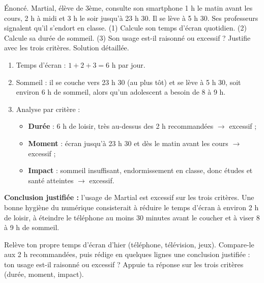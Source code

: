 \documentclass[11pt]{article}
\begin{document}
\begin{exoresolu}
Énoncé. Martial, élève de 3ème, consulte son smartphone 1 h le matin avant les cours, 2 h à midi et 3 h le soir jusqu'à 23 h 30. Il se lève à 5 h 30. Ses professeurs signalent qu'il s'endort en classe. (1) Calcule son temps d'écran quotidien. (2) Calcule sa durée de sommeil. (3) Son usage est-il raisonné ou excessif ? Justifie avec les trois critères.
\tcblower
Solution détaillée.
\begin{enumerate}
\item Temps d'écran : $1 + 2 + 3 = 6$ h par jour.
\item Sommeil : il se couche vers 23 h 30 (au plus tôt) et se lève à 5 h 30, soit environ $6$ h de sommeil, alors qu'un adolescent a besoin de 8 à 9 h.
\item Analyse par critère :
\begin{itemize}
\item \textbf{Durée} : 6 h de loisir, très au-dessus des 2 h recommandées $\rightarrow$ excessif ;
\item \textbf{Moment} : écran jusqu'à 23 h 30 et dès le matin avant les cours $\rightarrow$ excessif ;
\item \textbf{Impact} : sommeil insuffisant, endormissement en classe, donc études et santé atteintes $\rightarrow$ excessif.
\end{itemize}
\end{enumerate}
\textbf{Conclusion justifiée :} l'usage de Martial est excessif sur les trois critères. Une bonne hygiène du numérique consisterait à réduire le temps d'écran à environ 2 h de loisir, à éteindre le téléphone au moins 30 minutes avant le coucher et à viser 8 à 9 h de sommeil.
\end{exoresolu}

\begin{exercice}
Relève ton propre temps d'écran d'hier (téléphone, télévision, jeux). Compare-le aux 2 h recommandées, puis rédige en quelques lignes une conclusion justifiée : ton usage est-il raisonné ou excessif ? Appuie ta réponse sur les trois critères (durée, moment, impact).
\end{exercice}
\end{document}
